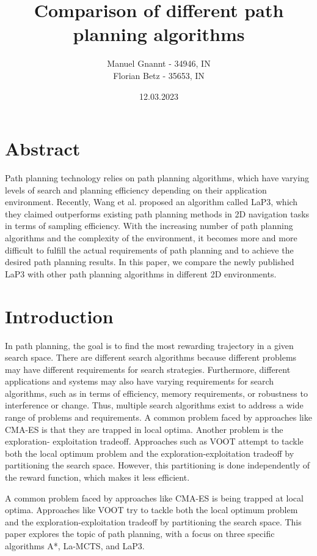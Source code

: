\documentclass[bibliography=totoc]{scrartcl}
\title{Comparison of different path planning algorithms}
\author{Manuel Gnannt - 34946, IN \\ Florian Betz - 35653, IN}
\date{12.03.2023}%
\begin{document}
\maketitle
\tableofcontents

\clearpage
\section{Abstract}
Path planning technology relies on path planning algorithms, which have varying levels of search and planning efficiency depending on their application environment.
Recently, Wang et al. proposed an algorithm called \ac{LaP3}, which they claimed outperforms existing path planning methods in 2D navigation tasks in terms of sampling efficiency. 
With the increasing number of path planning algorithms and the complexity of the environment, it becomes more and more difficult to fulfill the actual requirements of path planning and to achieve the desired path planning results.
In this paper, we compare the newly published \ac{LaP3} with other path planning algorithms in different 2D environments.

\section{Introduction}
In path planning, the goal is to find the most rewarding trajectory in a given search space.
There are different search algorithms because different problems may have different requirements for search strategies.
Furthermore, different applications and systems may also have varying requirements for search algorithms, such as in terms of efficiency, memory requirements, or robustness to interference or change. 
Thus, multiple search algorithms exist to address a wide range of problems and requirements.
A common problem faced by approaches like \ac{CMA-ES} \cite{CMA-ES} is that they are trapped in local optima.
Another problem is the exploration- exploitation tradeoff.
Approaches such as \ac{VOOT} \cite{VOOT} attempt to tackle both the local optimum problem and the exploration-exploitation tradeoff by partitioning the search space.
However, this partitioning is done independently of the reward function, which makes it less efficient.

A common problem faced by approaches like \ac{CMA-ES} \cite{CMA-ES} is being trapped at local optima. 
Approaches like \ac{VOOT} \cite{VOOT} try to tackle both the local optimum problem and the exploration-exploitation tradeoff by partitioning the search space.
This paper explores the topic of path planning, with a focus on three specific algorithms A*, \ac{La-MCTS}, and \ac{LaP3}. 
\end{document}
